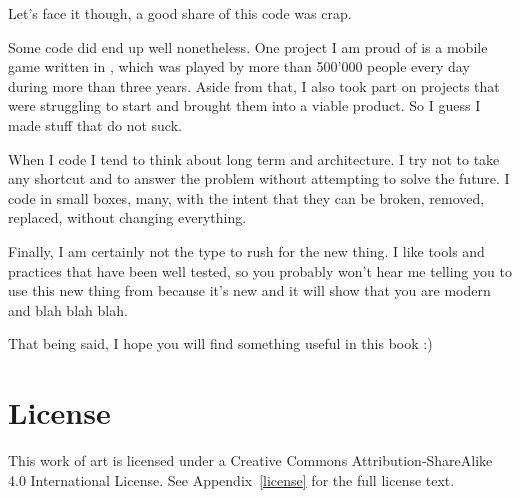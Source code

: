 Let's face it though, a good share of this code was crap.

\bigskip

Some code did end up well nonetheless. One project I am proud of is a
mobile game written in \cpp, which was played by more than 500'000
people every day during more than three years. Aside from that, I also
took part on projects that were struggling to start and brought them
into a viable product. So I guess I made stuff that do not suck.

When I code I tend to think about long term and architecture. I try
not to take any shortcut and to answer the problem without attempting
to solve the future. I code in small boxes, many, with the intent that
they can be broken, removed, replaced, without changing everything.

Finally, I am certainly not the type to rush for the new thing. I like
tools and practices that have been well tested, so you probably won't
hear me telling you to use this new thing from  because it's
new and it will show that you are modern and blah blah blah.

\bigskip

That being said, I hope you will find something useful in this book :)

\section{License}
This work of art is licensed under a Creative Commons
Attribution-ShareAlike 4.0 International License. See
Appendix~\ref{license} for the full license text.

\renewcommand*\thesection{\arabic{chapter}.\arabic{section}}
